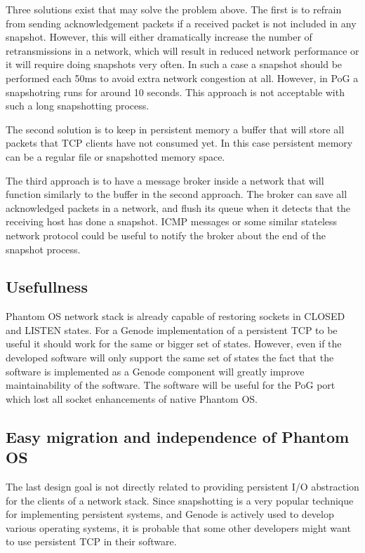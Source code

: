 Three solutions exist that may solve the problem above. The first is to refrain
from sending acknowledgement packets if a received packet is not included in any
snapshot. However, this will either dramatically increase the number of
retransmissions in a network, which will result in reduced network performance
or it will require doing snapshots very often. In such a case a snapshot should
be performed each 50ms to avoid extra network congestion at all. However, in
PoG a snapshotring runs for around 10 seconds. This approach is not acceptable
with such a long snapshotting process.  

The second solution is to keep in persistent memory a buffer that will store
all packets that TCP clients have not consumed yet. In this case persistent
memory can be a regular file or snapshotted memory space. 

The third approach is to have a message broker inside a network that will
function similarly to the buffer in the second approach. The broker can save
all acknowledged packets in a network, and flush its queue when it detects that
the receiving host has done a snapshot. ICMP messages or some similar stateless
network protocol could be useful to notify the broker about the end of the
snapshot process.

\subsection {Usefullness}

Phantom OS network stack is already capable of restoring sockets in CLOSED and
LISTEN states. For a Genode implementation of a persistent TCP to be useful it
should work for the same or bigger set of states. However, even if the
developed software will only support the same set of states the fact that the
software is implemented as a Genode component will greatly improve
maintainability of the software. The software will be useful for the PoG port
which lost all socket enhancements of native Phantom OS.

\subsection {Easy migration and independence of Phantom OS}

The last design goal is not directly related to providing persistent I/O
abstraction for the clients of a network stack. Since snapshotting is a very
popular technique for implementing persistent systems, and Genode is actively
used to develop various operating systems, it is probable that some other
developers might want to use persistent TCP in their software.

